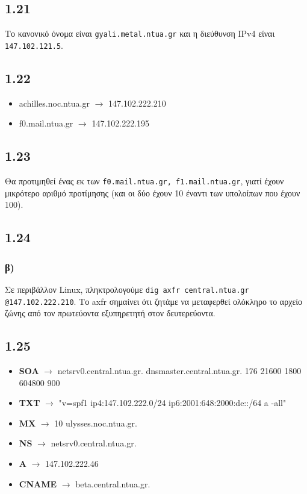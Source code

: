 		\subsection*{1.21} 
			Το κανονικό όνομα είναι \verb|gyali.metal.ntua.gr| και η διεύθυνση IPv4 είναι \verb|147.102.121.5|.

		\subsection*{1.22} 
			\begin{itemize}
				\item achilles.noc.ntua.gr $\rightarrow$ 147.102.222.210
				\item f0.mail.ntua.gr  $\rightarrow$ 147.102.222.195
			\end{itemize}

		\subsection*{1.23} 
			Θα προτιμηθεί ένας εκ των \verb|f0.mail.ntua.gr, f1.mail.ntua.gr|, γιατί έχουν μικρότερο αριθμό προτίμησης (και οι δύο έχουν 10 έναντι των υπολοίπων που έχουν 100).

		\subsection*{1.24} 
			\subsubsection*{β)} 
				Σε περιβάλλον Linux, πληκτρολογούμε \verb|dig axfr central.ntua.gr @147.102.222.210|. Το axfr σημαίνει ότι ζητάμε να μεταφερθεί ολόκληρο το αρχείο ζώνης από τον πρωτεύοντα εξυπηρετητή στον δευτερεύοντα. 

		\subsection*{1.25} 
			\begin{itemize}
				\item \textbf{SOA} $\rightarrow$ netsrv0.central.ntua.gr. dnsmaster.central.ntua.gr. 176 21600 1800 604800 900
				\item \textbf{TXT} $\rightarrow$ "v=spf1 ip4:147.102.222.0/24 ip6:2001:648:2000:de::/64 a -all"
				\item \textbf{MX} $\rightarrow$ 10 ulysses.noc.ntua.gr.
				\item \textbf{NS} $\rightarrow$ netsrv0.central.ntua.gr.
				\item \textbf{A} $\rightarrow$ 147.102.222.46
				\item \textbf{CNAME} $\rightarrow$ beta.central.ntua.gr.
			\end{itemize}



